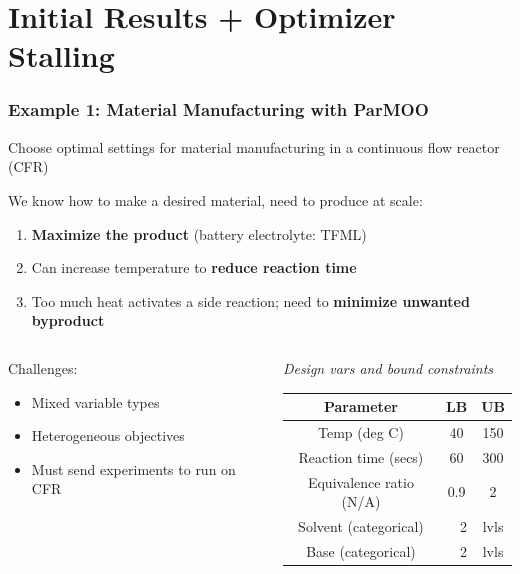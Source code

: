 \documentclass[aspectratio=169]{beamer}
\begin{document}
\section{Initial Results + Optimizer Stalling}

\begin{frame}\frametitle{Example 1: Material Manufacturing with ParMOO}
Choose optimal settings for material manufacturing in a
continuous flow reactor (CFR)

\bigskip

We know how to make a desired material, need to produce at scale:

\begin{enumerate}
\item {\color{green} \bf Maximize the product} (battery electrolyte: TFML)
\item Can increase temperature to {\bf \color{red} reduce reaction time}
\item Too much heat activates a side reaction; need to
{\bf \color{blue} minimize unwanted byproduct}
\end{enumerate}

\bigskip
\begin{columns}
\begin{column}{0.5\textwidth}
Challenges:

\begin{itemize}
\item Mixed variable types
\item Heterogeneous objectives
\item Must send experiments to run on CFR
\end{itemize}
\end{column}
\begin{column}{0.5\textwidth}
  {\small
  {\sl Design vars and bound constraints}

  \smallskip

      \begin{tabular}{c|cc}
      Parameter & LB & UB \\
      \hline
       Temp (deg C) & 40 & 150 \\
       Reaction time (secs) & 60 & 300 \\
       Equivalence ratio (N/A) & 0.9 & 2 \\
      \hline
       Solvent (categorical) & $\quad$2 & lvls \\
       Base (categorical) & $\quad$2 & lvls \\
  \end{tabular}
  }
\end{column}
\end{columns}
\end{frame}
\end{document}
